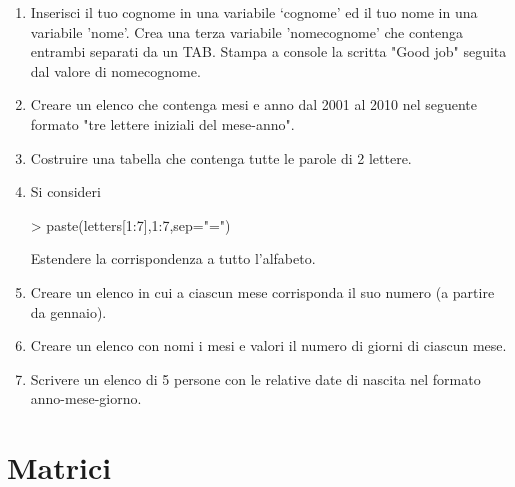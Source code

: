 \documentclass[onecolumn,11pt]{book}
\begin{document}
 \begin{shaded}
 \begin{enumerate}
 \item{} Inserisci il tuo cognome in una variabile `cognome' ed il tuo nome in una variabile 'nome'. Crea una terza variabile 'nomecognome' che contenga entrambi separati da un TAB. Stampa a console la scritta "Good job" seguita dal valore di nomecognome.
  \item{} Creare un elenco che contenga mesi e anno dal 2001 al 2010 nel seguente formato "tre lettere iniziali del mese-anno".
 \item{} Costruire una tabella che contenga tutte le parole di 2 lettere.
\item{}
Si consideri 
\begin{Schunk}
\begin{Sinput}
> paste(letters[1:7],1:7,sep="=")
\end{Sinput}
\end{Schunk}
Estendere la corrispondenza a tutto l'alfabeto.
\item Creare un elenco in cui a ciascun mese corrisponda il suo numero (a partire da gennaio).
\item Creare un elenco con nomi i mesi e valori il numero di giorni di ciascun mese.
\item Scrivere un elenco di 5 persone con le relative date di nascita nel formato anno-mese-giorno.
 \end{enumerate}
 \end{shaded}
 
\section{Matrici} 
\end{document}
